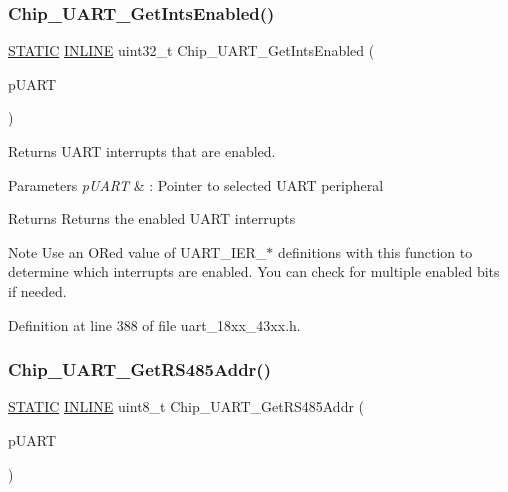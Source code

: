 \subsubsection{\texorpdfstring{Chip\+\_\+\+U\+A\+R\+T\+\_\+\+Get\+Ints\+Enabled()}{Chip\_UART\_GetIntsEnabled()}}
{\footnotesize\ttfamily \hyperlink{group___l_p_c___types___public___macros_ga10b2d890d871e1489bb02b7e70d9bdfb}{S\+T\+A\+T\+IC} \hyperlink{spifi__18xx__43xx_8h_a2eb6f9e0395b47b8d5e3eeae4fe0c116}{I\+N\+L\+I\+NE} uint32\+\_\+t Chip\+\_\+\+U\+A\+R\+T\+\_\+\+Get\+Ints\+Enabled (\begin{DoxyParamCaption}\item[{\hyperlink{struct_l_p_c___u_s_a_r_t___t}{L\+P\+C\+\_\+\+U\+S\+A\+R\+T\+\_\+T} $\ast$}]{p\+U\+A\+RT }\end{DoxyParamCaption})}



Returns U\+A\+RT interrupts that are enabled. 


\begin{DoxyParams}{Parameters}
{\em p\+U\+A\+RT} & \+: Pointer to selected U\+A\+RT peripheral \\
\hline
\end{DoxyParams}
\begin{DoxyReturn}{Returns}
Returns the enabled U\+A\+RT interrupts 
\end{DoxyReturn}
\begin{DoxyNote}{Note}
Use an OR\textquotesingle{}ed value of U\+A\+R\+T\+\_\+\+I\+E\+R\+\_\+$\ast$ definitions with this function to determine which interrupts are enabled. You can check for multiple enabled bits if needed. 
\end{DoxyNote}


Definition at line 388 of file uart\+\_\+18xx\+\_\+43xx.\+h.

\mbox{\label{group___u_a_r_t__18_x_x__43_x_x_ga1c96142bb767ca604ad468977c5e546c}} 
\subsubsection{\texorpdfstring{Chip\+\_\+\+U\+A\+R\+T\+\_\+\+Get\+R\+S485\+Addr()}{Chip\_UART\_GetRS485Addr()}}
{\footnotesize\ttfamily \hyperlink{group___l_p_c___types___public___macros_ga10b2d890d871e1489bb02b7e70d9bdfb}{S\+T\+A\+T\+IC} \hyperlink{spifi__18xx__43xx_8h_a2eb6f9e0395b47b8d5e3eeae4fe0c116}{I\+N\+L\+I\+NE} uint8\+\_\+t Chip\+\_\+\+U\+A\+R\+T\+\_\+\+Get\+R\+S485\+Addr (\begin{DoxyParamCaption}\item[{\hyperlink{struct_l_p_c___u_s_a_r_t___t}{L\+P\+C\+\_\+\+U\+S\+A\+R\+T\+\_\+T} $\ast$}]{p\+U\+A\+RT }\end{DoxyParamCaption})}



